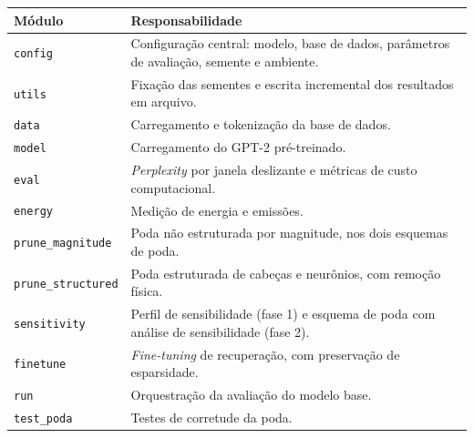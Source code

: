 \begin{quadro}[htb]
\centering
\caption{Organização modular da implementação.}
\label{tab:modulos}
\small
\begin{tabular}{p{3.4cm} p{9.6cm}}
\hline
\textbf{Módulo} & \textbf{Responsabilidade} \\
\hline
\texttt{config} & Configuração central: modelo, base de dados, parâmetros de avaliação, semente e ambiente. \\
\texttt{utils} & Fixação das sementes e escrita incremental dos resultados em arquivo. \\
\texttt{data} & Carregamento e tokenização da base de dados. \\
\texttt{model} & Carregamento do GPT-2 pré-treinado. \\
\texttt{eval} & \textit{Perplexity} por janela deslizante e métricas de custo computacional. \\
\texttt{energy} & Medição de energia e emissões. \\
\texttt{prune\_magnitude} & Poda não estruturada por magnitude, nos dois esquemas de poda. \\
\texttt{prune\_structured} & Poda estruturada de cabeças e neurônios, com remoção física. \\
\texttt{sensitivity} & Perfil de sensibilidade (fase 1) e esquema de poda com análise de sensibilidade (fase 2). \\
\texttt{finetune} & \textit{Fine-tuning} de recuperação, com preservação de esparsidade. \\
\texttt{run} & Orquestração da avaliação do modelo base. \\
\texttt{test\_poda} & Testes de corretude da poda. \\
\hline
\end{tabular}
\end{quadro}

